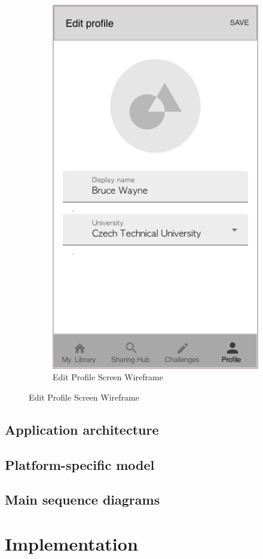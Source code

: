 \documentclass[thesis=B,english]{FITthesis}[2012/10/20]
\begin{document}
\begin{figure}[H]
\begin{subfigure}{.5\textwidth}
  \includegraphics[scale=0.45]{editProfile}
  \caption{Edit Profile Screen Wireframe}
  \label{fig:section-editprofile}
\end{subfigure}
\end{figure}


\section{Application architecture}
\section{Platform-specific model}
\section{Main sequence diagrams}

\chapter{Implementation}
\end{document}
